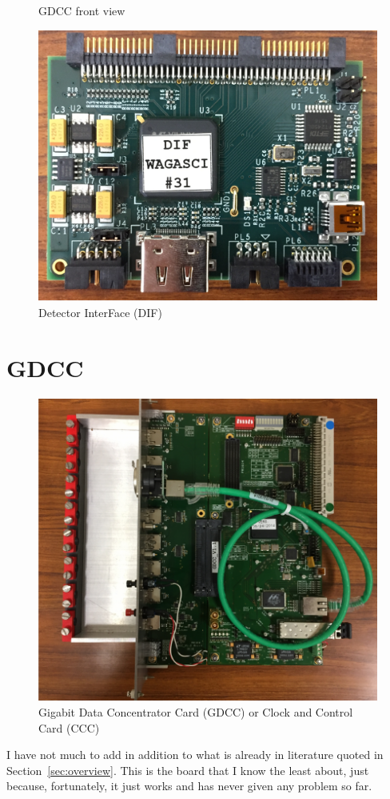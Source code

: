 \begin{figure}[H]
\begin{minipage}{0.2\linewidth}
  \caption{GDCC front view}\label{fig:GDCC-front-view}
  \end{minipage}%
  \begin{minipage}{0.7\linewidth}
  \centering \includegraphics[width=0.9\linewidth, frame]{DIF}
  \caption{Detector InterFace (DIF)}
  \end{minipage}
\end{figure}
  
\section{GDCC}
\begin{figure}[ht]
  \centering
    \includegraphics[width=0.7\linewidth, frame]{GDCC}
    \caption{Gigabit Data Concentrator Card (GDCC) or Clock and Control Card (CCC)}
  \end{figure}
I have not much to add in addition to what is already in literature
quoted in Section~\ref{sec:overview}. This is the board that I know
the least about, just because, fortunately, it just works and has
never given any problem so far.

